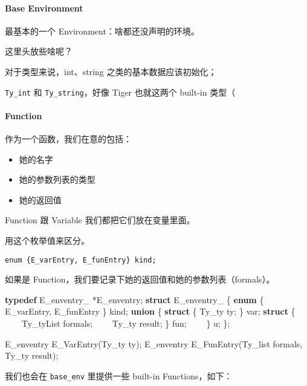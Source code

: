 \documentclass[
]{article}
\newenvironment{Shaded}{}{}
\newcommand{\KeywordTok}[1]{\textcolor[rgb]{0.00,0.44,0.13}{\textbf{#1}}}
\newcommand{\NormalTok}[1]{#1}
\begin{document}
\hypertarget{header-n104}{%
\paragraph{Base Environment}\label{header-n104}}

最基本的一个 Environment：啥都还没声明的环境。

这里头放些啥呢？

对于类型来说，int、string 之类的基本数据应该初始化；

\texttt{Ty\_int} 和 \texttt{Ty\_string}，好像 Tiger 也就这两个 built-in
类型（

\hypertarget{header-n109}{%
\paragraph{Function}\label{header-n109}}

作为一个函数，我们在意的包括：

\begin{itemize}
\item
  她的名字
\item
  她的参数列表的类型
\item
  她的返回值
\end{itemize}

Function 跟 Variable 我们都把它们放在变量里面。

用这个枚举值来区分。

\texttt{enum\ \{E\_varEntry,\ E\_funEntry\}\ kind;}

如果是 Function，我们要记录下她的返回值和她的参数列表（formals）。

\begin{Shaded}
\begin{Highlighting}[]
\KeywordTok{typedef}\NormalTok{ E_enventry_ *E_enventry; }
\KeywordTok{struct}\NormalTok{ E_enventry_ \{}
    \KeywordTok{enum}\NormalTok{ \{ E_varEntry, E_funEntry \} kind;}
    \KeywordTok{union}\NormalTok{ \{}
        \KeywordTok{struct}\NormalTok{ \{ Ty_ty ty; \} var;}
        \KeywordTok{struct}\NormalTok{ \{}
\NormalTok{            Ty_tyList formals; }
\NormalTok{            Ty_ty result;}
\NormalTok{        \} fun;    }
\NormalTok{    \} u;}
\NormalTok{ \};}

\NormalTok{E_enventry E_VarEntry(Ty_ty ty);}
\NormalTok{E_enventry E_FunEntry(Ty_list formals, Ty_ty result);}
\end{Highlighting}
\end{Shaded}

我们也会在 \texttt{base\_env} 里提供一些 built-in Functions，如下：
\end{document}

